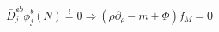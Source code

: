 \begin{equation}
\bar{D}_{j}^{ab} \phi_{j}^{b} (N) \overset{\text{!}}{=} 0 \Rightarrow 
(\rho \partial_{\rho } -m+\Phi ) f_M =0
\end{equation}

